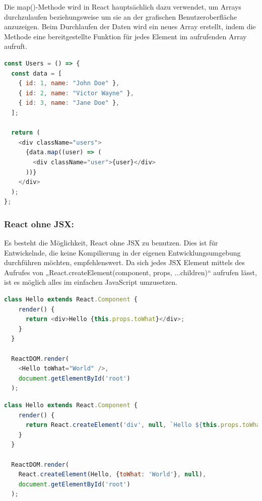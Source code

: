 Die map()-Methode wird in React hauptsächlich dazu verwendet, um Arrays durchzulaufen beziehungsweise um sie an der grafischen Benutzeroberfläche anzuzeigen. Beim Durchlaufen der Daten wird ein neues Array erstellt, indem die Methode eine bereitgestellte Funktion für jedes Element im aufrufenden Array aufruft.
\cite{Map}

\begin{lstlisting}[language=JavaScript, caption=Beispiel Code für die Nutzung der map()-Methode, label=lst:impl:mapMethode]
  const Users = () => {
  const data = [
    { id: 1, name: "John Doe" },
    { id: 2, name: "Victor Wayne" },
    { id: 3, name: "Jane Doe" },
  ];

  return (
    <div className="users">
      {data.map((user) => (
        <div className="user">{user}</div>
      ))}
    </div>
  );
};
\end{lstlisting} \cite{Map}

\subsubsection{React ohne JSX:}
Es besteht die Möglichkeit, React ohne JSX zu benutzen. Dies ist für Entwickelnde, die keine Kompilierung in der eigenen Entwicklungsumgebung durchführen möchten, empfehlenswert.
Da sich jedes JSX Element mittels des Aufrufes von „React.createElement(component, props, ...children)“ aufrufen lässt, ist es möglich alles im einfachen JavaScript umzusetzen.
\cite{JSX}

\begin{lstlisting}[language=JavaScript, caption=Beispiel Code 'Hello World' mit JSX, label=lst:impl:helloWorldJSX]
  class Hello extends React.Component {
    render() {
      return <div>Hello {this.props.toWhat}</div>;
    }
  }

  ReactDOM.render(
    <Hello toWhat="World" />,
    document.getElementById('root')
  );
\end{lstlisting} \cite{ReactWithoutJSX}

\begin{lstlisting}[language=JavaScript, caption='Hello World' mit einfachem JavaScript, label=lst:impl:helloWorldJSX]
  class Hello extends React.Component {
    render() {
      return React.createElement('div', null, `Hello ${this.props.toWhat}`);
    }
  }
  
  ReactDOM.render(
    React.createElement(Hello, {toWhat: 'World'}, null),
    document.getElementById('root')
  );
\end{lstlisting} \cite{ReactWithoutJSX}


